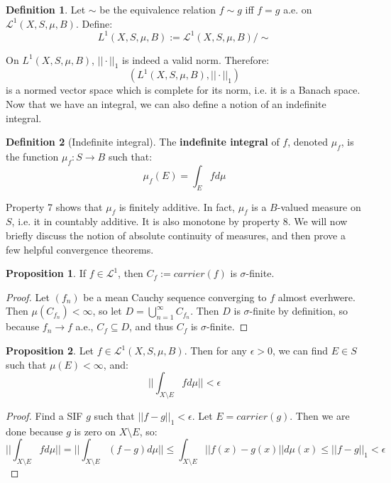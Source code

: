 \documentclass[11pt, oneside]{amsart}   	%
\theoremstyle{definition}
\newtheorem{definition}{Definition}[section]
\newtheorem{prop}{Proposition}[section]
\begin{document}
	\begin{definition}
		Let $\sim$ be the equivalence relation $f\sim g$ iff $f = g$ a.e. on $\mathcal L^1(X, S, \mu, B)$. Define:
		$$
			L^1(X, S, \mu, B) := \mathcal L^1(X, S, \mu, B) / \sim
		$$
	\end{definition}
	
	On $L^1(X, S, \mu, B)$, $||\cdot||_1$ is indeed a valid norm. Therefore:
	$$
		(L^1(X, S, \mu, B), ||\cdot||_1)
	$$
	is a normed vector space which is complete for its norm, i.e. it is a Banach space. Now that we have an integral, we 
	can also define a notion of an indefinite integral.
	
	\begin{definition}[Indefinite integral]
		The \textbf{indefinite integral} of $f$, denoted $\mu_f$, is the function $\mu_f : S\rightarrow B$ such that:
		$$
			\mu_f(E) = \int_E fd\mu
		$$
	\end{definition}
	
	Property 7 shows that $\mu_f$ is finitely additive. In fact, $\mu_f$ is a $B$-valued measure on $S$, i.e. it in countably 
	additive. It is also monotone by property 8. We will now briefly discuss the notion of absolute continuity of measures, and then 
	prove a few helpful convergence theorems.
	
	\begin{prop}
		If $f\in\mathcal L^1$, then $C_f := carrier(f)$ is $\sigma$-finite. 
	\end{prop}
	
	\begin{proof}
		Let $(f_n)$ be a mean Cauchy sequence converging to $f$ almost everhwere. Then $\mu(C_{f_n}) < \infty$, so 
		let $D = \bigcup_{n = 1}^\infty C_{f_n}$. Then $D$ is $\sigma$-finite by definition, so because $f_n\rightarrow f$ 
		a.e., $C_f\subseteq D$, and thus $C_f$ is $\sigma$-finite. 
	\end{proof}
	
	\begin{prop}
		Let $f\in\mathcal L^1(X, S, \mu, B)$. Then for any $\epsilon > 0$, we can find $E\in S$ such that $\mu(E) < \infty$, 
		and:
		$$
			||\int_{X\setminus E} fd\mu|| < \epsilon
		$$
	\end{prop}
	
	\begin{proof}
		Find a SIF $g$ such that $||f - g||_1 < \epsilon$. Let $E = carrier(g)$. Then we are done because $g$ is zero on 
		$X\setminus E$, so:
		$$
			||\int_{X\setminus E} fd\mu|| = ||\int_{X\setminus E} (f - g)d\mu|| \leq \int_{X\setminus E} ||f(x) - g(x)||d\mu(x)
			\leq ||f - g||_1 < \epsilon
		$$
	\end{proof}
	
\end{document}
